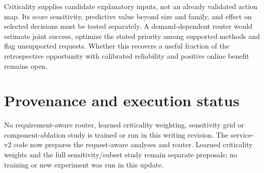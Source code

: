 Criticality supplies candidate explanatory inputs, not an already validated
action map. Its score sensitivity, predictive value beyond size and family,
and effect on selected decisions must be tested separately. A demand-dependent
router would estimate joint success, optimize the stated priority among
supported methods and flag unsupported requests. Whether this recovers a
useful fraction of the retrospective opportunity with calibrated reliability
and positive online benefit remains open.

\section*{Provenance and execution status}

No requirement-aware router, learned criticality weighting, sensitivity grid
or component-ablation study is trained or run in this writing revision.
The service-v2 code now prepares the request-aware analyses and router.
Learned criticality weights and the full sensitivity/subset study remain
separate proposals; no training or new experiment was run in this update.



